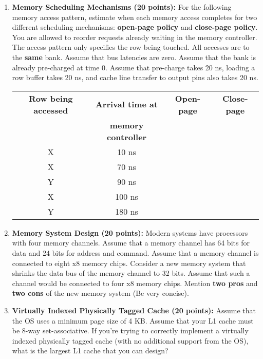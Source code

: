 \documentclass[a4paper, 11pt]{exam}
\begin{document}
\begin{enumerate}
 \item \textbf{Memory Scheduling Mechanisms (20 points): } For the following memory access pattern, estimate when each memory access completes for two different scheduling mechanisms: \textbf{open-page policy} and \textbf{close-page policy}. You are allowed to reorder requests already waiting in the memory controller. The access pattern only specifies the row being touched. All accesses are to the \textbf{same} bank. Assume that bus latencies are zero. Assume that the bank is already pre-charged at time 0. Assume that pre-charge takes 20 ns, loading a row buffer takes 20 ns, and cache line transfer to output pins also takes 20 ns.\newline


\begin{center}
\begin{tabular}{|c|c|c|c|}
 \hline
 \textbf{Row being accessed} & \textbf{Arrival time at} & \textbf{Open-page} & \textbf{Close-page} \\
  & \textbf{memory controller} & & \\
 \hline
 X  & 10 ns &  & \\
 \hline
 X  & 70 ns &  & \\
 \hline
 Y  & 90 ns &  & \\
 \hline
 X  & 100 ns &  & \\
 \hline
 Y  & 180 ns &  & \\
 \hline
 \end{tabular}
\end{center}

 
\item \textbf{Memory System Design (20 points): } Modern systems have processors with four memory channels. Assume that a memory channel has 64 bits for data and 24 bits for address and command.
Assume that a memory channel is connected to eight x8 memory chips. Consider a new memory system that shrinks the data bus of the memory channel to 32 bits. Assume that such a channel would be connected to four x8 memory chips. Mention \textbf{two pros} and \textbf{two cons} of the new memory system (Be very concise).\newline
 
\item \textbf {Virtually Indexed Physically Tagged Cache (20 points): }  Assume that the OS uses a minimum page size of 4 KB. Assume that your L1 cache must be 8-way set-associative. If you're trying to correctly implement a virtually indexed physically tagged cache (with no additional support from the OS), what is the largest L1 cache that you can design? \newline



\end{enumerate}
\end{document}
